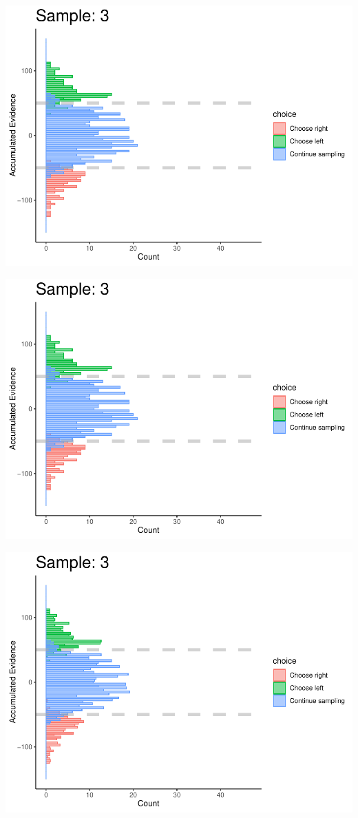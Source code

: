 \documentclass[
]{book}
\begin{document}
\begin{center}\includegraphics[width=0.8\linewidth]{LateNightBayes_files/figure-latex/fixed_check-25} \end{center}

\begin{center}\includegraphics[width=0.8\linewidth]{LateNightBayes_files/figure-latex/fixed_check-26} \end{center}

\begin{center}\includegraphics[width=0.8\linewidth]{LateNightBayes_files/figure-latex/fixed_check-27} \end{center}
\end{document}
